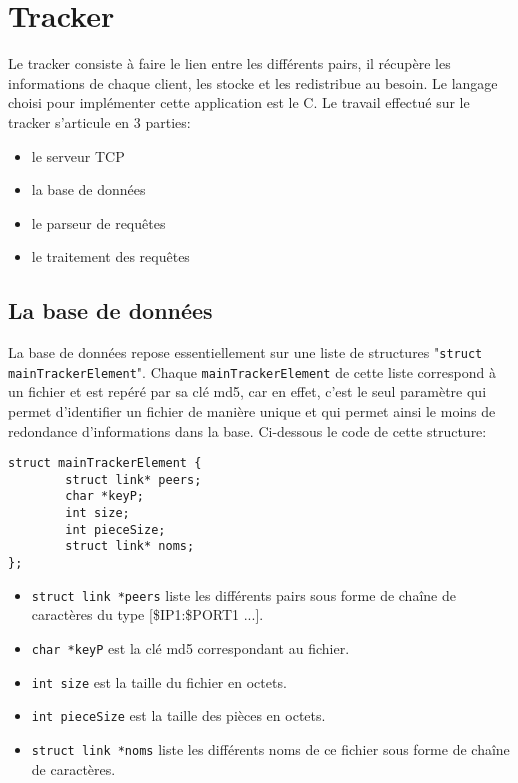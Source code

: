 \section{Tracker} 
Le tracker consiste à faire le lien entre les différents pairs, il récupère les informations de chaque client, les stocke et les redistribue au besoin. Le langage choisi pour implémenter cette application est le C. Le travail effectué sur le tracker s'articule en 3 parties: 
 
\begin{itemize} 
\item le serveur TCP 
\item la base de données 
\item le parseur de requêtes 
\item le traitement des requêtes 
\end{itemize} 
 
\subsection{La base de données} 
La base de données repose essentiellement sur une liste de structures "\texttt{struct mainTrackerElement}". Chaque \texttt{mainTrackerElement} de cette liste correspond à un fichier et est repéré par sa clé md5, car en effet, c'est le seul paramètre qui permet d'identifier un fichier de manière unique et qui permet ainsi le moins de redondance d'informations dans la base. Ci-dessous le code de cette structure: 
 
\begin{verbatim} 
struct mainTrackerElement { 
        struct link* peers; 
        char *keyP; 
        int size; 
        int pieceSize; 
        struct link* noms; 
}; 
\end{verbatim} 
 
\begin{itemize} 
\item \texttt{struct link *peers} liste les différents pairs sous forme de chaîne de caractères du type [\$IP1:\$PORT1 ...]. 
\item \texttt{char *keyP} est la clé md5 correspondant au fichier. 
\item \texttt{int size} est la taille du fichier en octets. 
\item \texttt{int pieceSize} est la taille des pièces en octets. 
\item \texttt{struct link *noms} liste les différents noms de ce fichier sous forme de chaîne de caractères. 
\end{itemize} 
 

